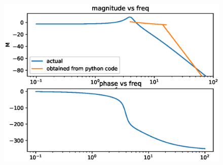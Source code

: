 \begin{enumerate}[label=\thesubsection.\arabic*.,ref=\thesubsection.\theenumi]
\begin{figure}[!ht]
\includegraphics[width=\columnwidth]{./figs/ee18btech11027/plot.eps} 
\caption{}
\label{fig:ee18btech11027}
\end{figure}

\end{enumerate}
